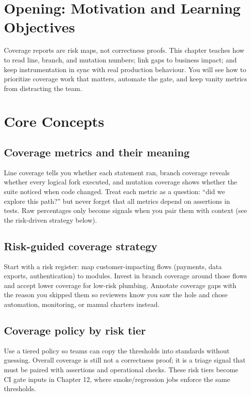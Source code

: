 \section{Opening: Motivation and Learning Objectives}
Coverage reports are risk maps, not correctness proofs. This chapter teaches how to read line, branch, and mutation numbers; link gaps to business impact; and keep instrumentation in sync with real production behaviour. You will see how to prioritize coverage work that matters, automate the gate, and keep vanity metrics from distracting the team.

\section{Core Concepts}
\subsection{Coverage metrics and their meaning}
Line coverage tells you whether each statement ran, branch coverage reveals whether every logical fork executed, and mutation coverage shows whether the suite noticed when code changed. Treat each metric as a question: ``did we explore this path?'' but never forget that all metrics depend on assertions in tests. Raw percentages only become signals when you pair them with context (see the risk-driven strategy below).

\subsection{Risk-guided coverage strategy}
Start with a risk register: map customer-impacting flows (payments, data exports, authentication) to modules. Invest in branch coverage around those flows and accept lower coverage for low-risk plumbing. Annotate coverage gaps with the reason you skipped them so reviewers know you saw the hole and chose automation, monitoring, or manual charters instead.

\subsection{Coverage policy by risk tier}
Use a tiered policy so teams can copy the thresholds into standards without guessing. Overall coverage is still not a correctness proof; it is a triage signal that must be paired with assertions and operational checks. These risk tiers become CI gate inputs in Chapter 12, where smoke/regression jobs enforce the same thresholds.

